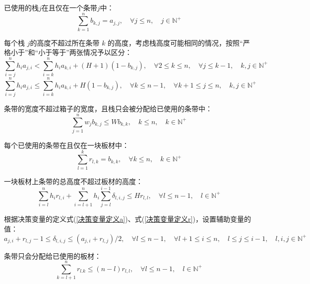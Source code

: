 \documentclass[bwprint]{gmcmthesis}
\begin{document}
已使用的栈$j$在且仅在一个条带$j$中：
\begin{equation}
    \sum_{k=1}^{n}  b_{k,j} = a_{j,j}, \quad \forall j \le n,\quad j \in \mathbb{N}^+  \label{栈精确排在条带}
\end{equation}

每个栈 $j$的高度不超过所在条带 $k$ 的高度，考虑栈高度可能相同的情况，按照“严格小于”和“小于等于”两张情况予以区分：
\begin{equation}
    \sum_{i=j}^{n} h_ia_{j,i}<\sum_{i=k}^n h_i a_{k,i}+(H+1)(1-b_{k,j}),\quad \forall  2 \le k \le n,\quad \forall j \le k-1, \quad k,j \in \mathbb{N}^+  \label{严格小于的高度限制}
\end{equation}
\begin{equation}
    \sum_{i=j}^{n} h_ia_{j,i} \le \sum_{i=k}^n h_i a_{k,i}+H(1-b_{k,j}), \quad \forall  k \le n-1, \quad \forall k+1 \le j \le n, \quad k,j \in \mathbb{N}^+ \label{小于等于的高度限制}
\end{equation}

条带的宽度不超过箱子的宽度，且栈只会被分配给已使用的条带中：
\begin{equation}
    \sum_{j=1}^{n} w_j b_{k,j} \le W b_{k,k}, \quad k \le n, \quad k \in \mathbb{N}^+ \label{宽度限制}
\end{equation}

每个已使用的条带在且仅在一块板材中：
\begin{equation}
    \sum_{l=1}^{k} r_{l,k} = b_{k,k}, \quad \forall k \le n, \quad k \in \mathbb{N}^+ \label{条带精准打包}
\end{equation}

一块板材上条带的总高度不超过板材的高度：
\begin{equation}
    \sum_{i=l}^{n} h_i r_{l,i} +\sum_{i=l+1}^{n} h_i \sum_{j=l}^{i-1} \delta_{l,i,j} \le H r_{l,l}, \quad \forall l \le n-1, \quad l \in \mathbb{N}^+\label{板材高度}
\end{equation}

根据决策变量的定义式(\ref{决策变量定义a})、式(\ref{决策变量定义r})，设置辅助变量的值：
\begin{equation}
    a_{j,i}+r_{l,j}-1 \le \delta_{l,i,j} \le (a_{j,i}+r_{l,j})/2, \quad \forall l \le n-1,\quad \forall l+1 \le i \le n, \quad l \le j \le i-1, \quad l,i,j \in \mathbb{N}^+ \label{决策变量相关}
\end{equation}

条带只会分配给已使用的板材：
\begin{equation}
    \sum_{k=l+1}^{n} r_{l.k} \le (n-l)r_{l,l}, \quad \forall l \le n-1, \quad l \in \mathbb{N}^+ \label{未使用板材无条带}
\end{equation}
\end{document}
